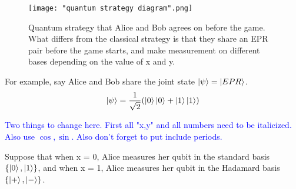 
\begin{figure}[h]
 \centering
    \texttt{[image: "quantum strategy diagram".png]}
    \caption{Quantum strategy that Alice and Bob agrees on before the game. What differs from the classical strategy is that they share an EPR pair before the game starts, and make measurement on different bases depending on the value of x and y.}
    \label{fig: quantum strategy diagram}
\end{figure}

For example, say Alice and Bob share the joint state $\ket{\psi}=\ket{EPR}$. 
\begin{equation*}
    \ket{\psi}=\frac{1}{\sqrt{2}}(\ket{0} \ket{0}+\ket{1} \ket{1})
\end{equation*}

\textcolor{blue}{Two things to change here.  First all "x,y" and all numbers need to be italicized.  Also use $\cos, \sin $.  Also don't forget to put include periods.}

Suppose that when x = 0, Alice measures her qubit in the standard basis $\{\ket{0}, \ket{1}\}$, and when x = 1, Alice measures her qubit in the Hadamard basis $\{\ket{+}, \ket{-}\}$.


